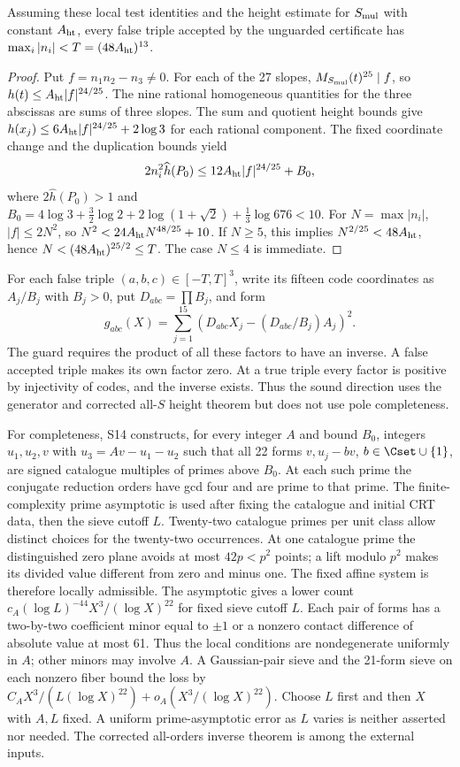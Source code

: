 \begin{proposition}\label{prop:box}
Assuming these local test identities and the height estimate for
$S_{\rm mul}$ with constant $A_{\rm ht}$, every false triple accepted
by the unguarded certificate has $\max_i|n_i|<T=(48A_{\rm ht})^{13}$.
\end{proposition}
\begin{proof}
Put $f=n_1n_2-n_3\ne0$. For each of the 27 slopes,
$M_{S_{\rm mul}}(t)^{25}\mid f$, so $h(t)\le A_{\rm ht}|f|^{24/25}$.
The nine rational homogeneous quantities for the three abscissas
are sums of three slopes. The sum and quotient height bounds give
$h(x_j)\le6A_{\rm ht}|f|^{24/25}+2\log3$ for each rational component.
The fixed coordinate change and the duplication bounds yield
\[
 2n_i^2\widehat h(P_0)\le12A_{\rm ht}|f|^{24/25}+B_0,
\]
where $2\widehat h(P_0)>1$ and
$B_0=4\log3+\tfrac32\log2+2\log(1+\sqrt2)+\tfrac13\log676<10$.
For $N=\max|n_i|$, $|f|\le2N^2$, so
$N^2<24A_{\rm ht}N^{48/25}+10$.
If $N\ge5$, this implies $N^{2/25}<48A_{\rm ht}$, hence
$N<(48A_{\rm ht})^{25/2}\le T$. The case $N\le4$ is immediate.
\end{proof}

For each false triple $(a,b,c)\in[-T,T]^3$, write its fifteen code
coordinates as $A_j/B_j$ with $B_j>0$, put $D_{abc}=\prod B_j$, and
form
\[
 g_{abc}(X)=\sum_{j=1}^{15}
       (D_{abc}X_j-(D_{abc}/B_j)A_j)^2.
\]
The guard requires the product of all these factors to have an inverse.
A false accepted triple makes its own factor zero. At a true triple
every factor is positive by injectivity of codes, and the inverse exists.
Thus the sound direction uses the generator and corrected all-$S$
height theorem but does not use pole completeness.

For completeness, S14 constructs, for every integer $A$ and bound $B_0$,
integers $u_1,u_2,v$ with $u_3=Av-u_1-u_2$ such that all 22 forms
$v,u_j-bv$, $b\in\Cset\cup\{1\}$, are signed catalogue multiples of
primes above $B_0$. At each such prime the conjugate reduction orders
have gcd four and are prime to that prime. The finite-complexity prime
asymptotic \cite{greentao,moebius,gtz} is used after fixing the catalogue
and initial CRT data, then the sieve cutoff $L$. Twenty-two catalogue
primes per unit class allow distinct choices for the twenty-two
occurrences. At one catalogue prime the distinguished zero plane avoids
at most $42p<p^2$ points; a lift modulo $p^2$ makes its divided value
different from zero and minus one. The fixed affine system is therefore
locally admissible. The asymptotic gives a lower count
$c_A(\log L)^{-44}X^3/(\log X)^{22}$ for fixed sieve cutoff $L$.
Each pair of forms has a two-by-two coefficient minor equal to
$\pm1$ or a nonzero contact difference of absolute value at most 61.
Thus the local conditions are nondegenerate uniformly in $A$;
other minors may involve $A$.
A Gaussian-pair sieve and the 21-form sieve on each nonzero fiber bound
the loss by $C_AX^3/(L(\log X)^{22})+o_A(X^3/(\log X)^{22})$.
Choose $L$ first and then $X$ with $A,L$ fixed. A uniform prime-asymptotic
error as $L$ varies is neither asserted nor needed. The corrected
all-orders inverse theorem is among the external inputs.

